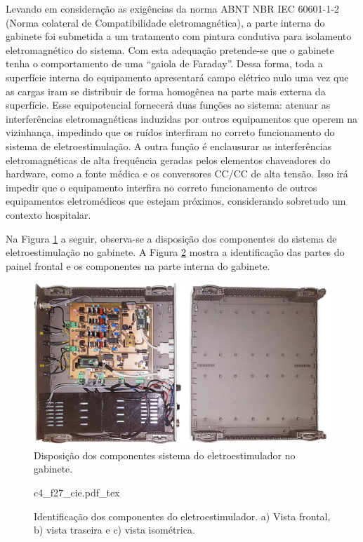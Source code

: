 Levando em consideração as exigências da norma \acrshort{ABNT} \acrshort{NBR} \acrshort{IEC} 60601-1-2 (Norma colateral de Compatibilidade eletromagnética), a parte interna do gabinete foi submetida a um tratamento com pintura condutiva para isolamento eletromagnético do sistema. Com esta adequação pretende-se que o gabinete tenha o comportamento de uma “gaiola de Faraday”. Dessa forma, toda a superfície interna do equipamento apresentará campo elétrico nulo uma vez que as cargas iram se distribuir de forma homogênea na parte mais externa da superfície. Esse equipotencial fornecerá duas funções ao sistema: atenuar as interferências eletromagnéticas induzidas por outros equipamentos que operem na vizinhança, impedindo que os ruídos interfiram no correto funcionamento do sistema de eletroestimulação. A outra função é enclausurar as interferências eletromagnéticas de alta frequência geradas pelos elementos chaveadores do hardware, como a fonte médica e os conversores CC/CC de alta tensão. Isso irá impedir que o equipamento interfira no correto funcionamento de outros equipamentos eletromédicos que estejam próximos, considerando sobretudo um contexto hospitalar.

Na Figura \ref{fig:c4_f26_dcgp} a seguir, observa-se a disposição dos componentes do sistema de eletroestimulação no gabinete. A Figura \ref{fig:c4_f27_mpci} mostra a identificação das partes do painel frontal e os componentes na parte interna do gabinete.

\begin{figure}
    \centering %
    \includegraphics[width=0.9\linewidth]{figs/Fig_c4/c4_f26_dcgp}
    \caption{Disposição dos componentes sistema do eletroestimulador no gabinete.}
    \label{fig:c4_f26_dcgp}
\end{figure}

\begin{figure}
    \centering %
    \small %
    \def\svgwidth{1\columnwidth}%
    {c4_f27_cie.pdf_tex}
    \caption{Identificação dos componentes do eletroestimulador. a) Vista frontal, b) vista traseira e c) vista isométrica.}
    \label{fig:c4_f27_mpci}
\end{figure}

